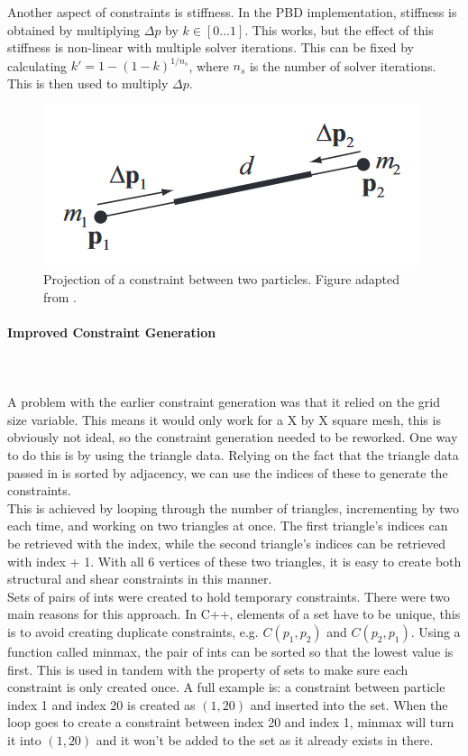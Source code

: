\documentclass[12pt,a4paper]{article}
\begin{document}
Another aspect of constraints is stiffness. In the PBD implementation, stiffness is obtained by multiplying ${\Delta}p$ by $k\in[0...1]$. This works, but the effect of this stiffness is non-linear with multiple solver iterations. This can be fixed by calculating $k'=1-(1-k)^{1/n_s}$, where $n_s$ is the number of solver iterations. This is then used to multiply ${\Delta}p$.
\begin{figure}
	\centering
	\includegraphics[scale=0.5]{constraint.png}
	\caption{Projection of a constraint between two particles. Figure adapted from \protect\cite{muller2007position}.}
	\label{fig:conproj}
\end{figure}
\paragraph{Improved Constraint Generation}\mbox{} \\ \\	
A problem with the earlier constraint generation was that it relied on the grid size variable. This means it would only work for a X by X square mesh, this is obviously not ideal, so the constraint generation needed to be reworked. One way to do this is by using the triangle data. Relying on the fact that the triangle data passed in is sorted by adjacency, we can use the indices of these to generate the constraints. \\

This is achieved by looping through the number of triangles, incrementing by two each time, and working on two triangles at once. The first triangle's indices can be retrieved with the index, while the second triangle's indices can be retrieved with index + 1. With all 6 vertices of these two triangles, it is easy to create both structural and shear constraints in this manner. \\

Sets of pairs of ints were created to hold temporary constraints. There were two main reasons for this approach. In C++, elements of a set have to be unique, this is to avoid creating duplicate constraints, e.g. $C(p_1,p_2)$ and $C(p_2,p_1)$. Using a function called minmax, the pair of ints can be sorted so that the lowest value is first. This is used in tandem with the property of sets to make sure each constraint is only created once. A full example is: a constraint between particle index 1 and index 20 is created as $(1,20)$ and inserted into the set. When the loop goes to create a constraint between index 20 and index 1, minmax will turn it into $(1,20)$ and it won't be added to the set as it already exists in there. \\
\end{document}
